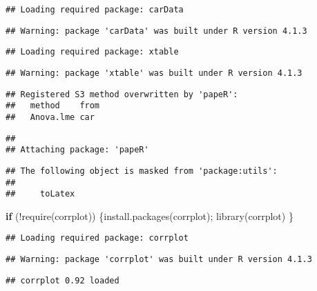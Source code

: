 \documentclass[
]{article}
\newenvironment{Shaded}{\begin{snugshade}}{\end{snugshade}}
\newcommand{\ControlFlowTok}[1]{\textcolor[rgb]{0.13,0.29,0.53}{\textbf{#1}}}
\newcommand{\FunctionTok}[1]{\textcolor[rgb]{0.00,0.00,0.00}{#1}}
\newcommand{\NormalTok}[1]{#1}
\newcommand{\SpecialCharTok}[1]{\textcolor[rgb]{0.00,0.00,0.00}{#1}}
\newcommand{\StringTok}[1]{\textcolor[rgb]{0.31,0.60,0.02}{#1}}
\begin{document}
\begin{verbatim}
## Loading required package: carData
\end{verbatim}

\begin{verbatim}
## Warning: package 'carData' was built under R version 4.1.3
\end{verbatim}

\begin{verbatim}
## Loading required package: xtable
\end{verbatim}

\begin{verbatim}
## Warning: package 'xtable' was built under R version 4.1.3
\end{verbatim}

\begin{verbatim}
## Registered S3 method overwritten by 'papeR':
##   method    from
##   Anova.lme car
\end{verbatim}

\begin{verbatim}
## 
## Attaching package: 'papeR'
\end{verbatim}

\begin{verbatim}
## The following object is masked from 'package:utils':
## 
##     toLatex
\end{verbatim}

\begin{Shaded}
\begin{Highlighting}[]
\ControlFlowTok{if}\NormalTok{ (}\SpecialCharTok{!}\FunctionTok{require}\NormalTok{(}\StringTok{\textquotesingle{}corrplot\textquotesingle{}}\NormalTok{)) \{}\FunctionTok{install.packages}\NormalTok{(}\StringTok{\textquotesingle{}corrplot\textquotesingle{}}\NormalTok{); }\FunctionTok{library}\NormalTok{(}\StringTok{\textquotesingle{}corrplot\textquotesingle{}}\NormalTok{)}
\NormalTok{\}}
\end{Highlighting}
\end{Shaded}

\begin{verbatim}
## Loading required package: corrplot
\end{verbatim}

\begin{verbatim}
## Warning: package 'corrplot' was built under R version 4.1.3
\end{verbatim}

\begin{verbatim}
## corrplot 0.92 loaded
\end{verbatim}
\end{document}
